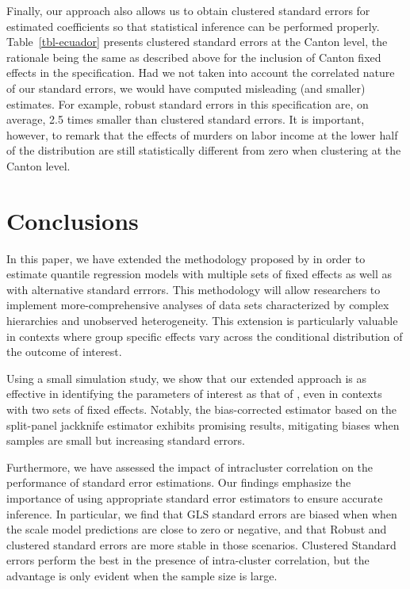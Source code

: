 \documentclass[
  12pt,
  oneside]{article}
\begin{document}
Finally, our approach also allows us to obtain clustered standard errors
for estimated coefficients so that statistical inference can be
performed properly. Table~\ref{tbl-ecuador} presents clustered standard
errors at the Canton level, the rationale being the same as described
above for the inclusion of Canton fixed effects in the specification.
Had we not taken into account the correlated nature of our standard
errors, we would have computed misleading (and smaller) estimates. For
example, robust standard errors in this specification are, on average,
2.5 times smaller than clustered standard errors. It is important,
however, to remark that the effects of murders on labor income at the
lower half of the distribution are still statistically different from
zero when clustering at the Canton level.

\section{Conclusions}\label{conclusions}

In this paper, we have extended the methodology proposed by
\citet{mss2019} in order to estimate quantile regression models with
multiple sets of fixed effects as well as with alternative standard
errrors. This methodology will allow researchers to implement
more-comprehensive analyses of data sets characterized by complex
hierarchies and unobserved heterogeneity. This extension is particularly
valuable in contexts where group specific effects vary across the
conditional distribution of the outcome of interest.

Using a small simulation study, we show that our extended approach is as
effective in identifying the parameters of interest as that of
\citet{mss2019}, even in contexts with two sets of fixed effects.
Notably, the bias-corrected estimator based on the split-panel jackknife
estimator exhibits promising results, mitigating biases when samples are
small but increasing standard errors.

Furthermore, we have assessed the impact of intracluster correlation on
the performance of standard error estimations. Our findings emphasize
the importance of using appropriate standard error estimators to ensure
accurate inference. In particular, we find that GLS standard errors are
biased when when the scale model predictions are close to zero or
negative, and that Robust and clustered standard errors are more stable
in those scenarios. Clustered Standard errors perform the best in the
presence of intra-cluster correlation, but the advantage is only evident
when the sample size is large.
\end{document}
